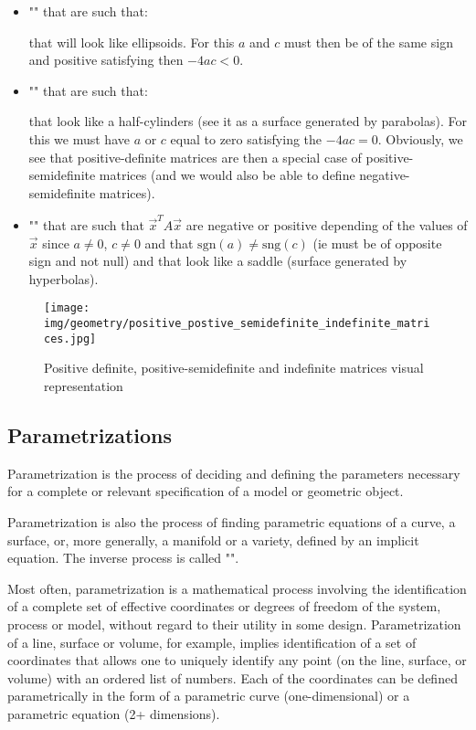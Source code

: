	\begin{itemize}
		\item "" that are such that:
		
		that will look like ellipsoids. For this $a$ and $c$ must then be of the same sign and positive satisfying then $-4ac<0$.
	
		\item "" that are such that:
		
		that look like a half-cylinders (see it as a surface generated by parabolas). For this we must have $a$ or $c$ equal to zero satisfying the $-4ac=0$. Obviously, we see that positive-definite matrices are then a special case of positive-semidefinite matrices (and we would also be able to define negative-semidefinite matrices).
	
		\item "" that are such that $\vec{x}^TA\vec{x}$ are negative or positive depending of the values of $\vec{x}$ since $a\neq 0$, $c\neq 0$ and that $\mathrm{sgn}(a)\neq\mathrm{sng}(c)$ (ie must be of opposite sign and not null) and that look like a saddle (surface generated by hyperbolas).
	\end{itemize}
	\begin{figure}[H]
		\centering
		\texttt{[image: img/geometry/positive\_postive\_semidefinite\_indefinite\_matrices.jpg]}
		\caption{Positive definite, positive-semidefinite and indefinite matrices visual representation}
	\end{figure}

	\pagebreak
	\subsection{Parametrizations}
	Parametrization  is the process of deciding and defining the parameters necessary for a complete or relevant specification of a model or geometric object.
	
	Parametrization is also the process of finding parametric equations of a curve, a surface, or, more generally, a manifold or a variety, defined by an implicit equation. The inverse process is called "".
	
	Most often, parametrization is a mathematical process involving the identification of a complete set of effective coordinates or degrees of freedom of the system, process or model, without regard to their utility in some design. Parametrization of a line, surface or volume, for example, implies identification of a set of coordinates that allows one to uniquely identify any point (on the line, surface, or volume) with an ordered list of numbers. Each of the coordinates can be defined parametrically in the form of a parametric curve (one-dimensional) or a parametric equation (2+ dimensions).
	
